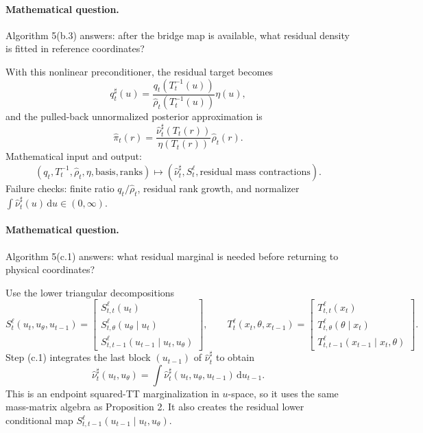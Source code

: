 \documentclass[11pt]{article}
\newcommand{\dd}{\,\mathrm d}
\begin{document}
\paragraph{Mathematical question.}
Algorithm 5(b.3) answers: after the bridge map is available, what residual
density is fitted in reference coordinates?

With this nonlinear preconditioner, the residual target becomes
\[
    q^\sharp_t(u)
    =
    \frac{q_t(T_t^{-1}(u))}
    {\widehat\rho_t(T_t^{-1}(u))}
    \eta(u),
    \label{eq:p24-p12}
\]
and the pulled-back unnormalized posterior approximation is
\[
    \widehat\pi_t(r)
    =
    \frac{\widehat\nu^\sharp_t(T_t(r))}
    {\eta(T_t(r))}
    \widehat\rho_t(r).
    \label{eq:p24-p13}
\]
Mathematical input and output:
\[
    (q_t,T_t^{-1},\widehat\rho_t,\eta,\text{basis},\text{ranks})
    \mapsto
    (\widehat\nu_t^\sharp,S_t^\ell,\text{residual mass contractions}).
    \label{eq:p24-p13a}
\]
Failure checks: finite ratio \(q_t/\widehat\rho_t\), residual rank growth, and
normalizer \(\int\widehat\nu_t^\sharp(u)\dd u\in(0,\infty)\).

\paragraph{Mathematical question.}
Algorithm 5(c.1) answers: what residual marginal is needed before returning to
physical coordinates?

Use
the lower triangular decompositions
\[
    S_t^{\ell}(u_t,u_\theta,u_{t-1})
    =
    \begin{bmatrix}
    S_{t,t}^{\ell}(u_t)\\
    S_{t,\theta}^{\ell}(u_\theta\mid u_t)\\
    S_{t,t-1}^{\ell}(u_{t-1}\mid u_t,u_\theta)
    \end{bmatrix},
    \qquad
    T_t^{\ell}(x_t,\theta,x_{t-1})
    =
    \begin{bmatrix}
    T_{t,t}^{\ell}(x_t)\\
    T_{t,\theta}^{\ell}(\theta\mid x_t)\\
    T_{t,t-1}^{\ell}(x_{t-1}\mid x_t,\theta)
    \end{bmatrix}.
    \label{eq:p24-p14}
\]
Step (c.1) integrates the last block \((u_{t-1})\) of
\(\widehat\nu_t^\sharp\) to obtain
\[
    \widehat\nu_t^\sharp(u_t,u_\theta)
    =
    \int\widehat\nu_t^\sharp(u_t,u_\theta,u_{t-1})\dd u_{t-1}.
    \label{eq:p24-p15}
\]
This is an endpoint squared-TT marginalization in \(u\)-space, so it uses the
same mass-matrix algebra as Proposition 2.  It also creates the residual lower
conditional map \(S_{t,t-1}^{\ell}(u_{t-1}\mid u_t,u_\theta)\).
\end{document}
